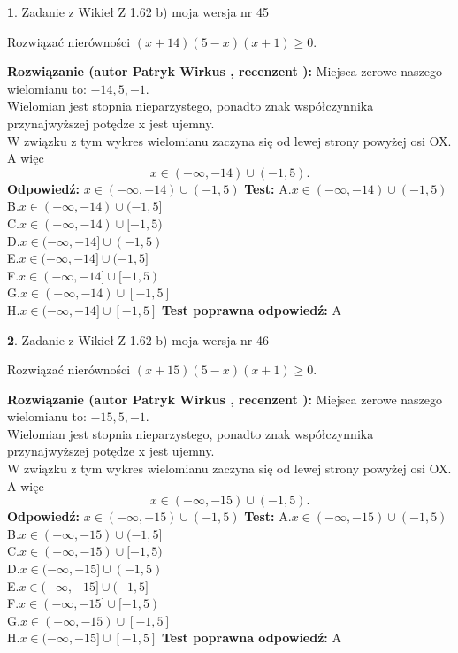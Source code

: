 \documentclass[12pt, a4paper]{article}
\theoremstyle{definition} %
\newtheorem{zad}{}
\newcommand{\zadStart}[1]{\begin{zad}#1\newline}
\newcommand{\zadStop}{\end{zad}}
\newcommand{\rozwStart}[2]{\noindent \textbf{Rozwiązanie (autor #1 , recenzent #2): }\newline}
\newcommand{\rozwStop}{\newline}
\newcommand{\odpStart}{\noindent \textbf{Odpowiedź:}\newline}
\newcommand{\odpStop}{\newline}
\newcommand{\testStart}{\noindent \textbf{Test:}\newline}
\newcommand{\testStop}{\newline}
\newcommand{\kluczStart}{\noindent \textbf{Test poprawna odpowiedź:}\newline}
\newcommand{\kluczStop}{\newline}
\begin{document}
\zadStart{Zadanie z Wikieł Z 1.62 b) moja wersja nr 45}

Rozwiązać nierówności $(x+14)(5-x)(x+1)\ge0$.
\zadStop
\rozwStart{Patryk Wirkus}{}
Miejsca zerowe naszego wielomianu to: $-14, 5, -1$.\\
Wielomian jest stopnia nieparzystego, ponadto znak współczynnika przy\linebreak najwyższej potędze x jest ujemny.\\ W związku z tym wykres wielomianu zaczyna się od lewej strony powyżej osi OX. A więc $$x \in (-\infty,-14) \cup (-1,5).$$
\rozwStop
\odpStart
$x \in (-\infty,-14) \cup (-1,5)$
\odpStop
\testStart
A.$x \in (-\infty,-14) \cup (-1,5)$\\
B.$x \in (-\infty,-14) \cup (-1,5]$\\
C.$x \in (-\infty,-14) \cup [-1,5)$\\
D.$x \in (-\infty,-14] \cup (-1,5)$\\
E.$x \in (-\infty,-14] \cup (-1,5]$\\
F.$x \in (-\infty,-14] \cup [-1,5)$\\
G.$x \in (-\infty,-14) \cup [-1,5]$\\
H.$x \in (-\infty,-14] \cup [-1,5]$
\testStop
\kluczStart
A
\kluczStop



\zadStart{Zadanie z Wikieł Z 1.62 b) moja wersja nr 46}

Rozwiązać nierówności $(x+15)(5-x)(x+1)\ge0$.
\zadStop
\rozwStart{Patryk Wirkus}{}
Miejsca zerowe naszego wielomianu to: $-15, 5, -1$.\\
Wielomian jest stopnia nieparzystego, ponadto znak współczynnika przy\linebreak najwyższej potędze x jest ujemny.\\ W związku z tym wykres wielomianu zaczyna się od lewej strony powyżej osi OX. A więc $$x \in (-\infty,-15) \cup (-1,5).$$
\rozwStop
\odpStart
$x \in (-\infty,-15) \cup (-1,5)$
\odpStop
\testStart
A.$x \in (-\infty,-15) \cup (-1,5)$\\
B.$x \in (-\infty,-15) \cup (-1,5]$\\
C.$x \in (-\infty,-15) \cup [-1,5)$\\
D.$x \in (-\infty,-15] \cup (-1,5)$\\
E.$x \in (-\infty,-15] \cup (-1,5]$\\
F.$x \in (-\infty,-15] \cup [-1,5)$\\
G.$x \in (-\infty,-15) \cup [-1,5]$\\
H.$x \in (-\infty,-15] \cup [-1,5]$
\testStop
\kluczStart
A
\kluczStop
\end{document}
